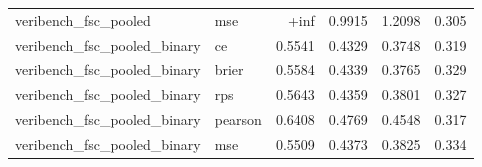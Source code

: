 \begin{tabular}{llrrrr}
veribench_fsc_pooled & mse & +inf & 0.9915 & 1.2098 & 0.305 \\
veribench_fsc_pooled_binary & ce & 0.5541 & 0.4329 & 0.3748 & 0.319 \\
veribench_fsc_pooled_binary & brier & 0.5584 & 0.4339 & 0.3765 & 0.329 \\
veribench_fsc_pooled_binary & rps & 0.5643 & 0.4359 & 0.3801 & 0.327 \\
veribench_fsc_pooled_binary & pearson & 0.6408 & 0.4769 & 0.4548 & 0.317 \\
veribench_fsc_pooled_binary & mse & 0.5509 & 0.4373 & 0.3825 & 0.334 \\
\hline
\end{tabular}

